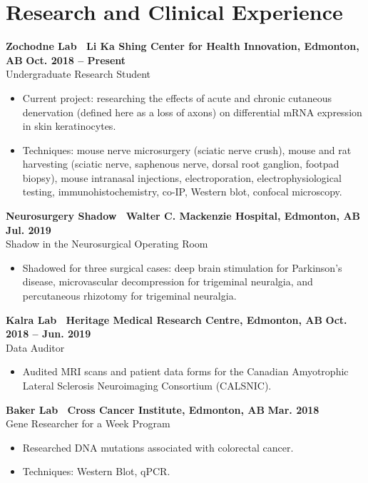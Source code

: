 \documentclass{article}
\begin{document}
\section*{\textcolor{my_red}{Research and Clinical Experience}}
    \textbf{Zochodne Lab \textbar\ Li Ka Shing Center for Health Innovation, Edmonton, AB} \hfill \textbf{Oct. 2018 -- Present}\\
    Undergraduate Research Student
    \begin{itemize}
        \item Current project: researching the effects of acute and chronic cutaneous denervation (defined here as a loss of axons) on differential mRNA expression in skin keratinocytes.
        \item Techniques: mouse nerve microsurgery (sciatic nerve crush), mouse and rat harvesting (sciatic nerve, saphenous nerve, dorsal root ganglion, footpad biopsy), mouse intranasal injections, electroporation, electrophysiological testing, immunohistochemistry, co-IP, Western blot, confocal microscopy.
    \end{itemize}

    \textbf{Neurosurgery Shadow \textbar\ Walter C. Mackenzie Hospital, Edmonton, AB} \hfill \textbf{Jul. 2019}\\
    Shadow in the Neurosurgical Operating Room
    \begin{itemize}
        \item Shadowed for three surgical cases: deep brain stimulation for Parkinson's disease, microvascular decompression for trigeminal neuralgia, and percutaneous rhizotomy for trigeminal neuralgia.
    \end{itemize}

    \textbf{Kalra Lab \textbar\ Heritage Medical Research Centre, Edmonton, AB} \hfill  \textbf{Oct. 2018 -- Jun. 2019}\\
    Data Auditor
    \begin{itemize}
        \item Audited MRI scans and patient data forms for the Canadian Amyotrophic Lateral Sclerosis Neuroimaging Consortium (CALSNIC).
    \end{itemize}

    \textbf{Baker Lab \textbar\ Cross Cancer Institute, Edmonton, AB} \hfill \textbf{Mar. 2018}\\
    Gene Researcher for a Week Program
    \begin{itemize}
        \item Researched DNA mutations associated with colorectal cancer.
        \item Techniques: Western Blot, qPCR.
    \end{itemize}
\end{document}
